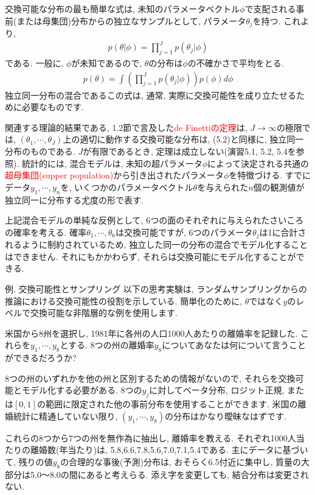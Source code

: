 \documentclass[10pt,dvipdfmx,a4]{beamer}
\newcommand{\eq}[1]{\begin{align}#1\end{align}}
\newcommand{\tcr}[1]{\textcolor{red}{#1}}
\begin{document}
\begin{frame}
交換可能な分布の最も簡単な式は, 未知のパラメータベクトル$\phi$で支配される事前(または母集団)分布からの独立なサンプルとして, パラメータ$\theta_j$を持つ.
これより,
\eq{p(\theta|\phi)=\prod_{j=1}^J p(\theta_j|\phi)}
である.
一般に, $\phi$が未知であるので, $\theta$の分布は$\phi$の不確かさで平均をとる.
\eq{p(\theta)=\int \left(\prod_{j=1}^Jp(\theta_j|\phi)\right)p(\phi)d\phi}
独立同一分布の混合であるこの式は, 通常, 実際に交換可能性を成り立たせるために必要なものです.
\end{frame}


\begin{frame}
関連する理論的結果である, 1.2節で言及した\tcr{de Finettiの定理}は, $J\rightarrow \infty$の極限では, $(\theta_1,\cdots,\theta_J)$上の適切に動作する交換可能な分布は, (5.2)と同様に, 独立同一分布のものである.
$J$が有限であるとき, 定理は成立しない(演習5.1, 5.2, 5.4を参照).
統計的には, 混合モデルは, 未知の超パラメータ$\phi$によって決定される共通の\tcr{超母集団(supper population)}から引き出されたパラメータ$\phi$を特徴づける.
すでにデータ$y_1,\cdots,y_n$を, いくつかのパラメータベクトル$\theta$を与えられた$n$個の観測値が独立同一に分布する尤度の形で表す.

上記混合モデルの単純な反例として, 6つの面のそれぞれに与えられたさいころの確率を考える.
確率$\theta_1,\cdots,\theta_6$は交換可能ですが, 6つのパラメータ$\theta_j$は1に合計されるように制約されているため, 独立した同一の分布の混合でモデル化することはできません.
それにもかかわらず, それらは交換可能にモデル化することができる.
\end{frame}


\begin{frame}{例. 交換可能性とサンプリング}
以下の思考実験は, ランダムサンプリングからの推論における交換可能性の役割を示している.
簡単化のために, $\theta$ではなく$y$のレベルで交換可能な非階層的な例を使用します.

米国から8州を選択し, 1981年に各州の人口1000人あたりの離婚率を記録した.
これらを$y_1, \cdots, y_8$とする.
8つの州の離婚率$y_8$についてあなたは何について言うことができるだろうか?

8つの州のいずれかを他の州と区別するための情報がないので, それらを交換可能とモデル化する必要がある.
8つの$y_j$に対してベータ分布, ロジット正規, または$[0, 1]$の範囲に限定された他の事前分布を使用することができます.
米国の離婚統計に精通していない限り, $(y_1,\cdots,y_8)$の分布はかなり曖昧なはずです.

これらの8つから7つの州を無作為に抽出し, 離婚率を教える.
それぞれ1000人当たりの離婚数(年当たり)は, 5.8,6.6,7.8,5.6,7.0,7.1,5.4である.
主にデータに基づいて, 残りの値$y_8$の合理的な事後(予測)分布は, おそらく6.5付近に集中し, 質量の大部分は5.0～8.0の間にあると考えらる.
添え字を変更しても, 結合分布は変更されない.
\end{frame}
\end{document}
